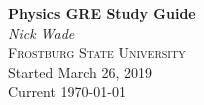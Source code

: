 \begin{titlepage}
	\centering
	\vspace*{5cm}
	{\huge\bfseries Physics GRE Study Guide} \\
	\vspace{2cm}
	{\Large\itshape Nick Wade} \\
	\vspace{0.5cm}
	{\scshape \Large Frostburg State University} \\
    \vspace{0.5cm}
    {\large Started March 26, 2019} \\
    \vspace{0.25cm}
	{\large Current \today} \\
	\vspace*{\fill}
\end{titlepage}